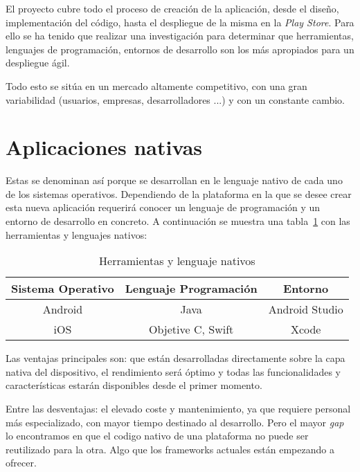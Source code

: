 
El proyecto cubre todo el proceso de creación de la aplicación, desde el diseño, implementación del código, hasta el despliegue de la misma en la \emph{Play Store}. Para ello se ha tenido que realizar una investigación para determinar que herramientas, lenguajes de programación, entornos de desarrollo son los más apropiados para un despliegue ágil.

Todo esto se sitúa en un mercado altamente competitivo, con una gran variabilidad (usuarios, empresas, desarrolladores ...) y con un constante cambio. 

\section{Aplicaciones nativas}
Estas se denominan así porque se desarrollan en le lenguaje nativo de cada uno de los sistemas operativos. Dependiendo de la plataforma en la que se desee crear esta nueva aplicación requerirá conocer un lenguaje de programación y un entorno de desarrollo en concreto. A continuación se muestra una tabla~\ref{table:nativos} con las herramientas y lenguajes nativos:

\begin{table}[H]
	\begin{center}
		\begin{tabular}{ccc}
			\hline
			Sistema Operativo                        & Lenguaje Programación & Entorno \\ \hline
			Android				    & Java      & Android Studio					\\
			iOS			    & Objetive C, Swift       & Xcode						\\ \hline
		\end{tabular}
		\caption{Herramientas y lenguaje nativos}
		\label{table:nativos}
	\end{center}
\end{table}

Las ventajas principales son: que están desarrolladas directamente sobre la capa nativa del dispositivo, el rendimiento será óptimo y todas las funcionalidades y características estarán disponibles desde el primer momento.

Entre las desventajas: el elevado coste y mantenimiento, ya que requiere personal más especializado, con mayor tiempo destinado al desarrollo. Pero el mayor \emph{gap} lo encontramos en que el codigo nativo de una plataforma no puede ser reutilizado para la otra. Algo que los frameworks actuales están empezando a ofrecer.

